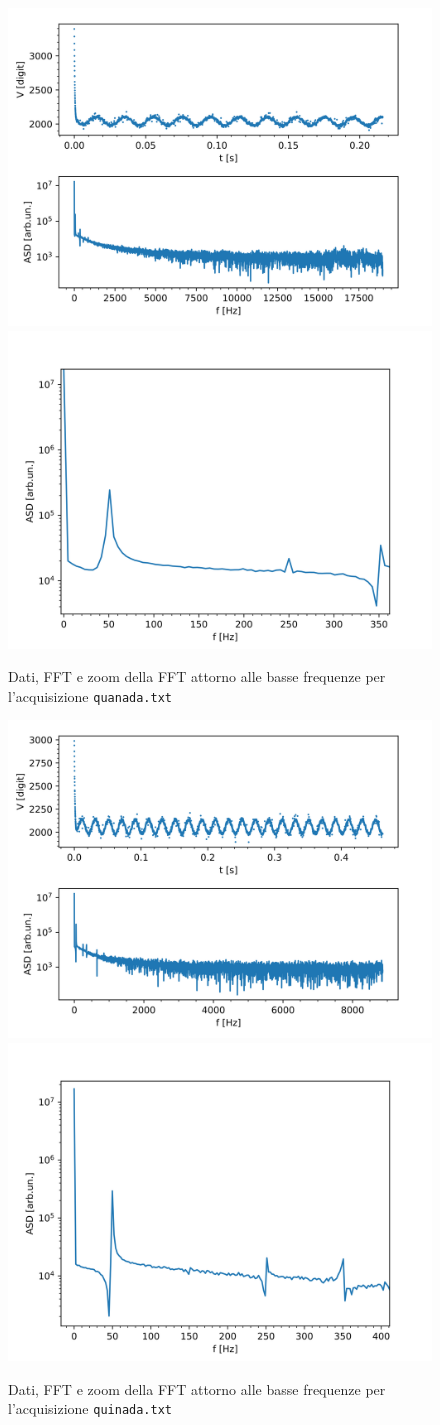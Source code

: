 \documentclass{article}[a4paper, oneside,11pt]
\begin{document}
\begin{figure}[H]
    \centering
    \includegraphics[width=0.45\columnwidth]{img/ese3/quanada}
    \includegraphics[width=0.48\columnwidth]{img/ese3/quanada-tagliato}
    \caption{Dati, FFT e zoom della FFT attorno alle basse frequenze per l'acquisizione \texttt{quanada.txt}}
    \label{fig:ese3-quanada}
\end{figure}

\begin{figure}[H]
    \centering
    \includegraphics[width=0.45\columnwidth]{img/ese3/quinada}
    \includegraphics[width=0.48\columnwidth]{img/ese3/quinada-tagliato}
    \caption{Dati, FFT e zoom della FFT attorno alle basse frequenze per l'acquisizione \texttt{quinada.txt}}
    \label{fig:ese3-quinada}
\end{figure}
\end{document}
